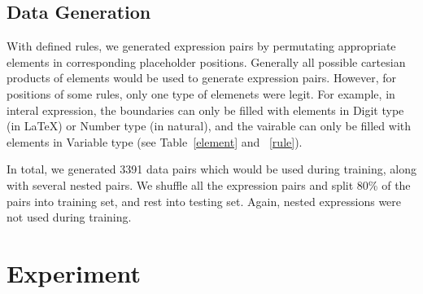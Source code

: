 \documentclass{article}
\begin{document}
\subsection{Data Generation}
With defined rules, we generated expression pairs by permutating appropriate elements in corresponding placeholder positions. Generally all possible cartesian products of elements would be used to generate expression pairs. However, for positions of some rules, only one type of elemenets were legit. For example, in interal expression, the boundaries can only be filled with elements in Digit type (in LaTeX) or Number type (in natural), and the vairable can only be filled with elements in Variable type (see Table~\ref{element} and ~\ref{rule}). \par 
In total, we generated 3391 data pairs which would be used during training, along with several nested pairs. We shuffle all the expression pairs and split 80\% of the pairs into training set, and rest into testing set. Again, nested expressions were not used during training. 
%
\section{Experiment}
%
\end{document}
